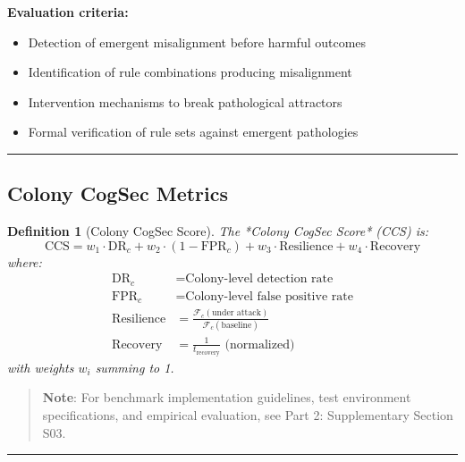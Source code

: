 \documentclass[
]{article}
\providecommand{\tightlist}{%
  \setlength{\itemsep}{0pt}\setlength{\parskip}{0pt}}
\newtheorem{definition}{Definition}[section]
\begin{document}
\textbf{Evaluation criteria:}

\begin{itemize}
\tightlist
\item
  Detection of emergent misalignment before harmful outcomes
\item
  Identification of rule combinations producing misalignment
\item
  Intervention mechanisms to break pathological attractors
\item
  Formal verification of rule sets against emergent pathologies
\end{itemize}

\begin{center}\rule{0.5\linewidth}{0.5pt}\end{center}

\subsection{Colony CogSec Metrics}\label{sec:colony-metrics}

\begin{definition}[Colony CogSec Score]
\label{def:cogsec-score}
The *Colony CogSec Score* (CCS) is:
\begin{equation}
\label{eq:ccs}
\text{CCS} = w_1 \cdot \text{DR}_c + w_2 \cdot (1 - \text{FPR}_c) + w_3 \cdot \text{Resilience} + w_4 \cdot \text{Recovery}
\end{equation}
where:
\begin{align}
\text{DR}_c &= \text{Colony-level detection rate} \\
\text{FPR}_c &= \text{Colony-level false positive rate} \\
\text{Resilience} &= \frac{\mathcal{F}_c(\text{under attack})}{\mathcal{F}_c(\text{baseline})} \\
\text{Recovery} &= \frac{1}{t_{\text{recovery}}} \text{ (normalized)}
\end{align}
with weights $w_i$ summing to 1.
\end{definition}

\begin{quote}
\textbf{Note}: For benchmark implementation guidelines, test environment
specifications, and empirical evaluation, see Part 2: Supplementary
Section S03.
\end{quote}

\begin{center}\rule{0.5\linewidth}{0.5pt}\end{center}
\end{document}
